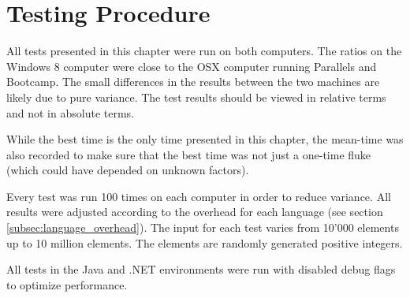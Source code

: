\section{Testing Procedure}
All tests presented in this chapter were run on both computers. The ratios on the Windows 8 computer were close to the OSX computer running Parallels and Bootcamp. The small differences in the results between the two machines are likely due to pure variance. The test results should be viewed in relative terms and not in absolute terms.

While the best time is the only time presented in this chapter, the mean-time was also recorded to make sure that the best time was not just a one-time fluke (which could have depended on unknown factors).

Every test was run 100 times on each computer in order to reduce variance. All results were adjusted according to the overhead for each language (see section \ref{subsec:language_overhead}). The input for each test varies from 10'000 elements up to 10 million elements. The elements are randomly generated positive integers.

All tests in the Java and .NET environments were run with disabled debug flags to optimize performance.
